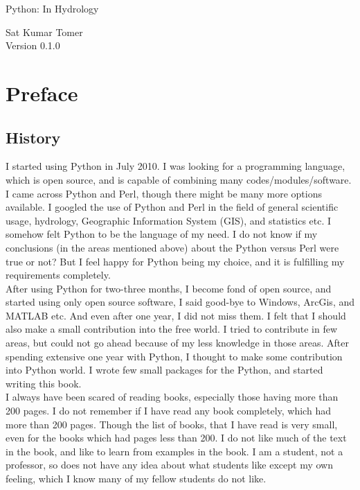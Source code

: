 \documentclass[10pt]{book}
\newcommand{\thetitle}{Python: In Hydrology}
\newcommand{\theversion}{0.1.0}
\begin{document}

\begin{htmlonly}


{\Large \thetitle}

{\large Sat Kumar Tomer} \\


Version \theversion

\setcounter{chapter}{-1}

\end{htmlonly}

\chapter{Preface}

\section*{History}

I started using Python in July 2010. I was looking for a programming language, 
which is open source, and is capable of combining many codes/modules/software. 
I came across Python and Perl, though there might be many more options available. 
I googled the use of Python and Perl in the field of general scientific usage, 
hydrology, Geographic Information System (GIS), and statistics etc. 
I somehow felt Python to be the language of my need. 
I do not know if my conclusions (in the areas mentioned above) about the Python 
versus Perl were true or not? But I feel happy for Python being my choice, 
and it is fulfilling my requirements completely. \\

After using Python for two-three months, I become fond of open source, 
and started using only open source software, I said good-bye to Windows, 
ArcGis, and MATLAB etc. And even after one year, I did not miss them. 
I felt that I should also make a small contribution into the free world. 
I tried to contribute in few areas, but could not go ahead because of my 
less knowledge in those areas. After spending extensive one year with Python, 
I thought to make some contribution into Python world. 
I wrote few small packages for the Python, and started writing this book. \\

I always have been scared of reading books, 
especially those having more than 200 pages. 
I do not remember if I have read any book completely, 
which had more than 200 pages. Though the list of books, 
that I have read is very small, even for the books which had pages less than 200. 
I do not like much of the text in the book, 
and like to learn from examples in the book. 
I am a student, not a professor, so does not have any idea about what students 
like except my own feeling, which I know many of my fellow students do not like. \\
\end{document}
